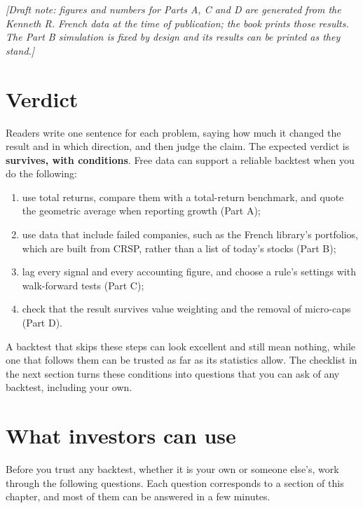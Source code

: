 \emph{[Draft note: figures and numbers for Parts A, C and D are generated from the Kenneth R. French data at the time of publication; the book prints those results. The Part B simulation is fixed by design and its results can be printed as they stand.]}

\section{Verdict}
\label{sec:02-verdict}

Readers write one sentence for each problem, saying how much it changed the result and in which direction, and then judge the claim. The expected verdict is \textbf{survives, with conditions}. Free data can support a reliable backtest when you do the following:

\begin{enumerate}
  \item use total returns, compare them with a total-return benchmark, and quote the geometric average when reporting growth (Part A);
  \item use data that include failed companies, such as the French library's portfolios, which are built from CRSP, rather than a list of today's stocks (Part B);
  \item lag every signal and every accounting figure, and choose a rule's settings with walk-forward tests (Part C);
  \item check that the result survives value weighting and the removal of micro-caps (Part D).
\end{enumerate}

A backtest that skips these steps can look excellent and still mean nothing, while one that follows them can be trusted as far as its statistics allow. The checklist in the next section turns these conditions into questions that you can ask of any backtest, including your own.

\section{What investors can use}
\label{sec:02-checklist}

Before you trust any backtest, whether it is your own or someone else's, work through the following questions. Each question corresponds to a section of this chapter, and most of them can be answered in a few minutes.

